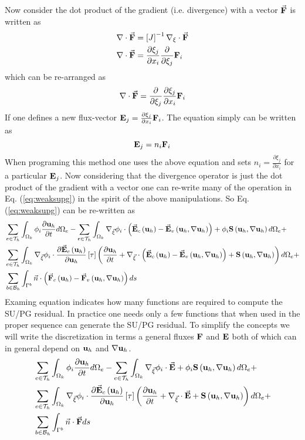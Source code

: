 \documentclass[letterpaper]{article}
\newcommand{\eqnref}[1]{Eq. (\ref{#1})}                %
\newcommand{\pd}[2]{\frac{ \partial #1}{\partial #2}}
\newcommand{\volint}[1]{ \sum_{e \in \mathcal{T}_{h}}\int_{\Omega_k} #1 d\Omega_{e} }
\newcommand{\bsurfint}[1]{\sum_{b\in \mathcal{B}_{h}}\int_{\Gamma^{b}} #1 ds}
\newcommand{\paren}[1]{\left( #1 \right)}
\newcommand{\sparen}[1]{\left[ #1 \right]}
\newcommand{\hb}[1]{ {\bf #1}_{h} } %
\newcommand{\fc}{\vec{{\bf F}}_{c} \paren{\hb{u}}   }
\newcommand{\fv}{\vec{{\bf F}}_{v} \paren{\hb{u},\nabla \hb{u}} }
\newcommand{\ec}{\vec{{\bf E}}_{c} \paren{\hb{u}}   }
\newcommand{\ev}{\vec{{\bf E}}_{v} \paren{\hb{u},\nabla \hb{u}} }
\begin{document}
Now consider the dot product of the gradient (i.e. divergence) with a vector $\vec{ {\bf F} }$ is written as
\begin{equation}
\begin{split}
& \nabla \cdot \vec{{\bf F}} = \sparen{J}^{-1}\nabla_{\xi} \cdot \vec{{\bf F}} \\
& \nabla \cdot \vec{{\bf F}} = \pd{\xi_{j}}{x_{i}}\pd{ }{\xi_{j}}   {\bf F}_{i}
\end{split}
\end{equation}
which can be re-arranged as 
\begin{equation}
 \nabla \cdot \vec{{\bf F}} =\pd{ }{\xi_{j}}  \pd{\xi_{j}}{x_{i}}{\bf F}_{i}
\end{equation}
If one defines a new flux-vector ${\bf E}_{j} =  \pd{\xi_{j}}{x_{i}}{\bf F}_{i} $.  The equation simply can be written as 
\begin{equation}
{\bf E}_{j} = n_{i}{\bf F}_{i}
\end{equation}
When programing this method one uses the above equation and sets $n_{i} =  \pd{\xi_{j}}{x_{i}}$ for a particular ${\bf E}_{j}$.  Now considering that the divergence operator is just the dot product of the gradient with a vector one can re-write many of the operation in \eqnref{eq:weaksupg} in the spirit of the above manipulations.  So \eqnref{eq:weaksupg} can be re-written as 
\begin{equation}\label{eq:weaksupg2}
\begin{split}
& \volint{\phi_{i}\pd{  \hb{u} } {t} } - \volint{\nabla_{\vec{\xi}} \phi_{i} \cdot \left( \ec - \ev \right)  + \phi_{i} {\bf S}\paren{ \hb{u}, \nabla \hb{u} } }  + \\
& \volint{ \nabla_{\vec{\xi}} \phi_{i}\cdot \pd{ \vec{ {\bf E}}_{c}\paren{\hb{u} }  }{\hb{u} }\sparen{\tau} 
\paren{ \pd{\hb{u}}{t} + \nabla_{\vec{\xi}} \cdot \paren{ \ec - \ev }  +  {\bf S}\paren{  \hb{u}, \nabla \hb{u} }}  } + \\ 
& \bsurfint{ \vec{n} \cdot  \paren{\fc - \fv } }
\end{split}
\end{equation}
Examing equation indicates how many functions are required to compute the SU/PG residual.  In practice one needs only a few functions that when used in the proper sequence can generate the SU/PG residual.  To simplify the concepts we will write the discretization in terms a general fluxes ${\bf F}$ and ${\bf E}$ both of which can in general depend on $\hb{u}$ and $\nabla\hb{u}$.  
\begin{equation}
\begin{split}
& \volint{\phi_{i}\pd{  \hb{u} } {t} } - \volint{\nabla_{\vec{\xi}} \phi_{i} \cdot \vec{{\bf E}}  + \phi_{i} {\bf S}\paren{ \hb{u}, \nabla \hb{u} } }  + \\
& \volint{ \nabla_{\vec{\xi}} \phi_{i}\cdot \pd{ \vec{ {\bf E}}_{c}\paren{\hb{u} }  }{\hb{u} }\sparen{\tau} 
\paren{ \pd{\hb{u}}{t} + \nabla_{\vec{\xi}} \cdot \vec{{\bf E}}   +  {\bf S}\paren{  \hb{u}, \nabla \hb{u} }}  } + \\ 
& \bsurfint{ \vec{n} \cdot  \vec{{\bf F} } }
\end{split}
\end{equation}
\end{document}
